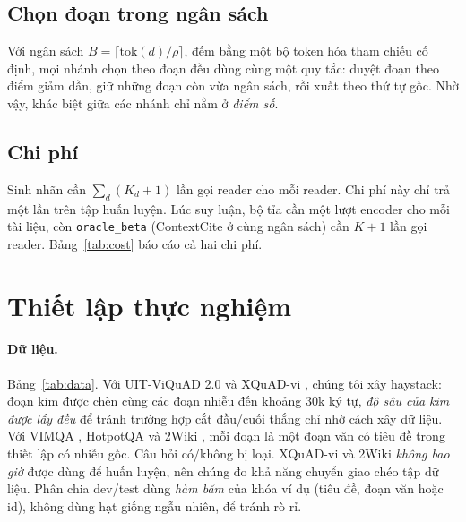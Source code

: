 \documentclass[11pt]{article}
\newcommand{\arm}[1]{\texttt{#1}}
\begin{document}
\subsection{Chọn đoạn trong ngân sách}
Với ngân sách $B=\lceil\mathrm{tok}(d)/\rho\rceil$, đếm bằng một bộ token hóa tham chiếu cố định, mọi
nhánh chọn theo đoạn đều dùng cùng một quy tắc: duyệt đoạn theo điểm giảm dần, giữ
những đoạn còn vừa ngân sách, rồi xuất theo thứ tự gốc. Nhờ vậy, khác biệt giữa các
nhánh chỉ nằm ở \emph{điểm số}.

\subsection{Chi phí}
Sinh nhãn cần $\sum_d (K_d+1)$ lần gọi reader cho mỗi reader. Chi phí này chỉ trả
một lần trên tập huấn luyện. Lúc suy luận, bộ tỉa cần một lượt encoder cho mỗi tài
liệu, còn \arm{oracle\_beta} (ContextCite ở cùng ngân sách) cần $K{+}1$ lần gọi
reader. Bảng~\ref{tab:cost} báo cáo cả hai chi phí.

\section{Thiết lập thực nghiệm}
\label{sec:setup}

\paragraph{Dữ liệu.} Bảng~\ref{tab:data}. Với UIT-ViQuAD 2.0 \citep{nguyen2020viquad,vimrc2022viquad2}
và XQuAD-vi \citep{artetxe2020xquad}, chúng tôi xây haystack: đoạn kim được chèn cùng
các đoạn nhiễu đến khoảng 30k ký tự, \emph{độ sâu của kim được lấy đều} để tránh
trường hợp cắt đầu/cuối thắng chỉ nhờ cách xây dữ liệu. Với VIMQA \citep{vimqa2022},
HotpotQA \citep{yang2018hotpotqa} và 2Wiki \citep{ho2020twowiki}, mỗi đoạn là một
đoạn văn có tiêu đề trong thiết lập có nhiễu gốc. Câu hỏi có/không bị loại.
XQuAD-vi và 2Wiki \emph{không bao giờ} được dùng để huấn luyện, nên chúng đo khả năng chuyển
giao chéo tập dữ liệu. Phân chia dev/test dùng \emph{hàm băm} của khóa ví dụ
(tiêu đề, đoạn văn hoặc id), không dùng hạt giống ngẫu nhiên, để tránh rò rỉ.
\end{document}

